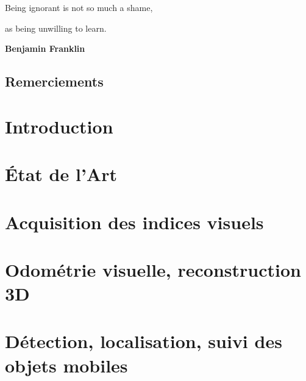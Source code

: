 \documentclass[11pt, a4paper]{book}
\begin{document}
\sloppy																%



\cleardoublepage

\vspace*{5cm}
\hfill \og Being ignorant is not so much a shame,

\hfill as being unwilling to learn.\fg{}

\hfill \textbf{Benjamin Franklin}\\
\clearpage 

\section*{Remerciements}

\clearpage

\setcounter{tocdepth}{2}

\dominitoc
\tableofcontents
{}
\clearpage

\listoffigures
\mtcaddchapter
\clearpage


\chapter{Introduction}
\label{sec:ch1}


\chapter{État de l'Art}
\label{sec:ch2}


\chapter{Acquisition des indices visuels} 
\label{sec:ch3}


\chapter{Odométrie visuelle, reconstruction 3D} 
\label{sec:ch4}


\chapter{Détection, localisation, suivi des objets mobiles} 
\label{sec:ch5}

\end{document}
